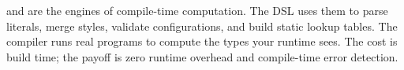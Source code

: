 \begin{recap}
 and  are the engines of
compile-time computation. The DSL uses them to parse literals,
merge styles, validate configurations, and build static lookup
tables. The compiler runs real programs to compute the types
your runtime sees. The cost is build time; the payoff is zero
runtime overhead and compile-time error detection.
\end{recap}
